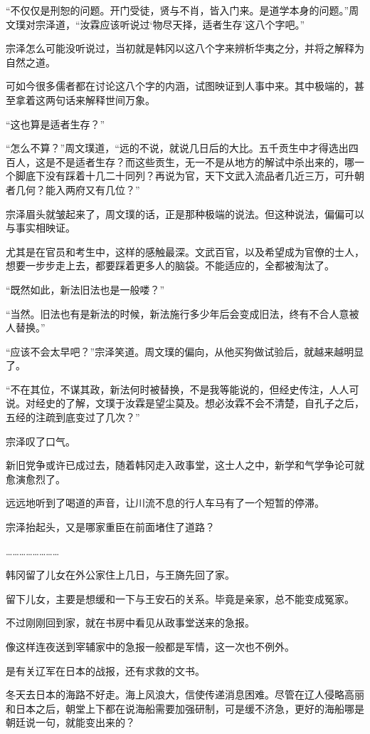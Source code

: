“不仅仅是刑恕的问题。开门受徒，贤与不肖，皆入门来。是道学本身的问题。”周文璞对宗泽道，“汝霖应该听说过‘物尽天择，适者生存’这八个字吧。”

宗泽怎么可能没听说过，当初就是韩冈以这八个字来辨析华夷之分，并将之解释为自然之道。

可如今很多儒者都在讨论这八个字的内涵，试图映证到人事中来。其中极端的，甚至拿着这两句话来解释世间万象。

“这也算是适者生存？”

“怎么不算？”周文璞道，“远的不说，就说几日后的大比。五千贡生中才得选出四百人，这是不是适者生存？而这些贡生，无一不是从地方的解试中杀出来的，哪一个脚底下没有踩着十几二十同列？再说为官，天下文武入流品者几近三万，可升朝者几何？能入两府又有几位？”

宗泽眉头就皱起来了，周文璞的话，正是那种极端的说法。但这种说法，偏偏可以与事实相映证。

尤其是在官员和考生中，这样的感触最深。文武百官，以及希望成为官僚的士人，想要一步步走上去，都要踩着更多人的脑袋。不能适应的，全都被淘汰了。

“既然如此，新法旧法也是一般喽？”

“当然。旧法也有是新法的时候，新法施行多少年后会变成旧法，终有不合人意被人替换。”

“应该不会太早吧？”宗泽笑道。周文璞的偏向，从他买狗做试验后，就越来越明显了。

“不在其位，不谋其政，新法何时被替换，不是我等能说的，但经史传注，人人可说。对经史的了解，文璞于汝霖是望尘莫及。想必汝霖不会不清楚，自孔子之后，五经的注疏到底变过了几次？”

宗泽叹了口气。

新旧党争或许已成过去，随着韩冈走入政事堂，这士人之中，新学和气学争论可就愈演愈烈了。

远远地听到了喝道的声音，让川流不息的行人车马有了一个短暂的停滞。

宗泽抬起头，又是哪家重臣在前面堵住了道路？

……………………

韩冈留了儿女在外公家住上几日，与王旖先回了家。

留下儿女，主要是想缓和一下与王安石的关系。毕竟是亲家，总不能变成冤家。

不过刚刚回到家，就在书房中看见从政事堂送来的急报。

像这样连夜送到宰辅家中的急报一般都是军情，这一次也不例外。

是有关辽军在日本的战报，还有求救的文书。

冬天去日本的海路不好走。海上风浪大，信使传递消息困难。尽管在辽人侵略高丽和日本之后，朝堂上下都在说海船需要加强研制，可是缓不济急，更好的海船哪是朝廷说一句，就能变出来的？

